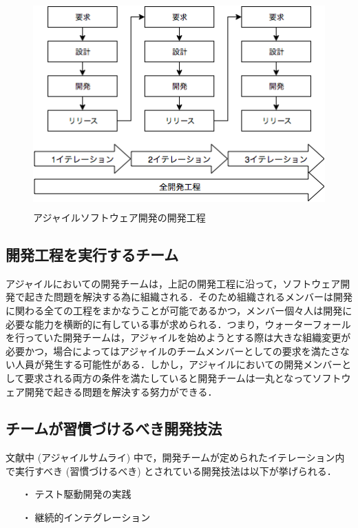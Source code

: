 \begin{figure}[H]
\centering
\includegraphics[height=8cm]{./assets/images/agile.png}
\caption{アジャイルソフトウェア開発の開発工程}
\label{fig:agile}
\end{figure}


\subsection{開発工程を実行するチーム}


アジャイルにおいての開発チームは，上記の開発工程に沿って，ソフトウェア開発で起きた問題を解決する為に組織される．そのため組織されるメンバーは開発に関わる全ての工程をまかなうことが可能であるかつ，メンバー個々人は開発に必要な能力を横断的に有している事が求められる．つまり，ウォーターフォールを行っていた開発チームは，アジャイルを始めようとする際は大きな組織変更が必要かつ，場合によってはアジャイルのチームメンバーとしての要求を満たさない人員が発生する可能性がある．しかし，アジャイルにおいての開発メンバーとして要求される両方の条件を満たしていると開発チームは一丸となってソフトウェア開発で起きる問題を解決する努力ができる．

\subsection{チームが習慣づけるべき開発技法}


文献中 (アジャイルサムライ) 中で，開発チームが定められたイテレーション内で実行すべき (習慣づけるべき) とされている開発技法は以下が挙げられる．

\begin{itemize}
 \item[・]テスト駆動開発の実践
 \item[・]継続的インテグレーション
\end{itemize}

